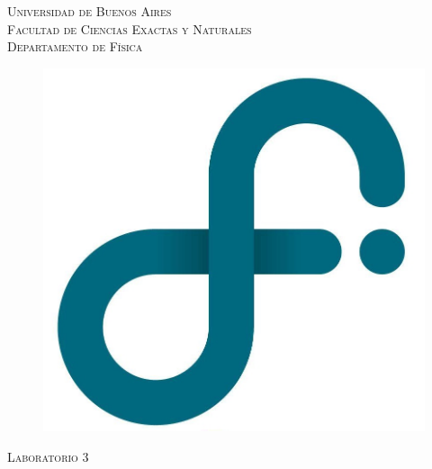 \begin{titlepage}

\newcommand{\HRule}{\rule{\linewidth}{0.5mm}} %

\center %
 

\textsc{\Huge Universidad de Buenos Aires}\\[0.5cm]
\textsc{\LARGE Facultad de Ciencias Exactas y Naturales}\\[0.5cm] %
\textsc{\Large Departamento de Física}\\[0.25cm] %

\begin{figure}[h]
  \centering
  \includegraphics[scale=0.15]{Logo_DF}
  \\[1.0cm]
\end{figure}

\textsc{\large Laboratorio 3}\\[0.5cm] %



\end{titlepage}

